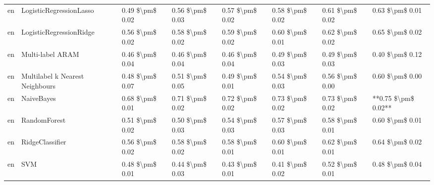 \begin{tabular}{llllllll}
      en &         LogisticRegressionLasso &     0.49 \$\textbackslash pm\$ 0.02 &           0.56 \$\textbackslash pm\$ 0.03 &       0.57 \$\textbackslash pm\$ 0.02 &        0.58 \$\textbackslash pm\$ 0.02 &                         0.61 \$\textbackslash pm\$ 0.02 &     0.63 \$\textbackslash pm\$ 0.01 \\
      en &         LogisticRegressionRidge &     0.56 \$\textbackslash pm\$ 0.02 &           0.58 \$\textbackslash pm\$ 0.02 &       0.59 \$\textbackslash pm\$ 0.02 &        0.60 \$\textbackslash pm\$ 0.01 &                         0.62 \$\textbackslash pm\$ 0.02 &     0.65 \$\textbackslash pm\$ 0.02 \\
      en &                Multi-label ARAM &     0.46 \$\textbackslash pm\$ 0.04 &           0.46 \$\textbackslash pm\$ 0.04 &       0.46 \$\textbackslash pm\$ 0.04 &        0.49 \$\textbackslash pm\$ 0.03 &                         0.49 \$\textbackslash pm\$ 0.03 &     0.40 \$\textbackslash pm\$ 0.12 \\
      en & Multilabel k Nearest Neighbours &     0.48 \$\textbackslash pm\$ 0.07 &           0.51 \$\textbackslash pm\$ 0.05 &       0.49 \$\textbackslash pm\$ 0.01 &        0.54 \$\textbackslash pm\$ 0.03 &                         0.56 \$\textbackslash pm\$ 0.00 &     0.60 \$\textbackslash pm\$ 0.00 \\
      en &                      NaiveBayes &     0.68 \$\textbackslash pm\$ 0.01 &           0.71 \$\textbackslash pm\$ 0.02 &       0.72 \$\textbackslash pm\$ 0.02 &        0.73 \$\textbackslash pm\$ 0.02 &                         0.73 \$\textbackslash pm\$ 0.02 & **0.75 \$\textbackslash pm\$ 0.02** \\
      en &                    RandomForest &     0.51 \$\textbackslash pm\$ 0.02 &           0.50 \$\textbackslash pm\$ 0.03 &       0.54 \$\textbackslash pm\$ 0.03 &        0.57 \$\textbackslash pm\$ 0.03 &                         0.58 \$\textbackslash pm\$ 0.01 &     0.60 \$\textbackslash pm\$ 0.01 \\
      en &                 RidgeClassifier &     0.56 \$\textbackslash pm\$ 0.02 &           0.58 \$\textbackslash pm\$ 0.02 &       0.58 \$\textbackslash pm\$ 0.01 &        0.60 \$\textbackslash pm\$ 0.01 &                         0.62 \$\textbackslash pm\$ 0.01 &     0.64 \$\textbackslash pm\$ 0.02 \\
      en &                             SVM &     0.48 \$\textbackslash pm\$ 0.01 &           0.44 \$\textbackslash pm\$ 0.03 &       0.43 \$\textbackslash pm\$ 0.01 &        0.41 \$\textbackslash pm\$ 0.02 &                         0.52 \$\textbackslash pm\$ 0.01 &     0.48 \$\textbackslash pm\$ 0.04 \\

\end{tabular}
